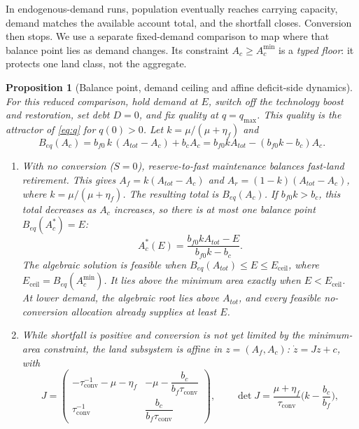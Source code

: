 \documentclass[preprint,12pt,authoryear]{elsarticle}
\newtheorem{proposition}{Proposition}
\newcommand{\Eceil}{E_{\mathrm{ceil}}}
\newcommand{\Acmin}{A_c^{\min}}
\newcommand{\tconv}{\tau_{\mathrm{conv}}}
\begin{document}
In endogenous-demand runs, population eventually reaches carrying capacity, demand matches the available account total, and the shortfall closes. Conversion then stops. We use a separate fixed-demand comparison to map where that balance point lies as demand changes. Its constraint $A_c\ge\Acmin$ is a \emph{typed floor}: it protects one land class, not the aggregate.

\begin{proposition}[Balance point, demand ceiling and affine deficit-side dynamics]\label{prop:ceiling}
For this reduced comparison, hold demand at $E$, switch off the technology boost and restoration, set debt $D=0$, and fix quality at $q=q_{\max}$. This quality is the attractor of \eqref{eq:q} for $q(0)>0$. Let $k=\mu/(\mu+\eta_f)$ and
\begin{equation}\label{eq:Beq}
B_{eq}(A_c)=b_{f0}\,k\,(A_{tot}-A_c)+b_cA_c=b_{f0}kA_{tot}-(b_{f0}k-b_c)A_c .
\end{equation}
\begin{enumerate}[label=(\roman*)]
\item With no conversion ($S=0$), reserve-to-fast maintenance balances fast-land retirement. This gives $A_f=k(A_{tot}-A_c)$ and $A_r=(1-k)(A_{tot}-A_c)$, where $k=\mu/(\mu+\eta_f)$. The resulting total is $B_{eq}(A_c)$. If $b_{f0}k>b_c$, this total decreases as $A_c$ increases, so there is at most one balance point $B_{eq}(A_c^*)=E$:
\begin{equation}\label{eq:Acstar}
A_c^*(E)=\frac{b_{f0}kA_{tot}-E}{b_{f0}k-b_c}.
\end{equation}
The algebraic solution is feasible when $B_{eq}(A_{tot})\le E\le\Eceil$, where $\Eceil=B_{eq}(\Acmin)$. It lies above the minimum area exactly when $E<\Eceil$. At lower demand, the algebraic root lies above $A_{tot}$, and every feasible no-conversion allocation already supplies at least $E$.
\item While shortfall is positive and conversion is not yet limited by the minimum-area constraint, the land subsystem is affine in $z=(A_f,A_c)$: $\dot z=Jz+c$, with
\begin{equation}\label{eq:J}
J=\begin{pmatrix}-\tconv^{-1}-\mu-\eta_f & -\mu-\dfrac{b_c}{b_f\tconv}\\[8pt] \tconv^{-1} & \dfrac{b_c}{b_f\tconv}\end{pmatrix},
\qquad \det J=\frac{\mu+\eta_f}{\tconv}\Big(k-\frac{b_c}{b_f}\Big),
\end{equation}

\end{enumerate}
\end{proposition}
\end{document}
